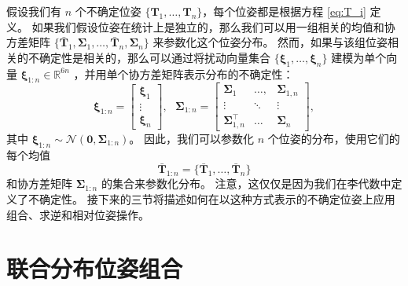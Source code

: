 


假设我们有 $n$ 个不确定位姿 $\{\mathbf{T}_1, \dots, \mathbf{T}_n\}$，每个位姿都是根据方程 \eqref{eq:T_i} 定义。 
如果我们假设位姿在统计上是独立的，那么我们可以用一组相关的均值和协方差矩阵 $\{\bar{\mathbf{T}}_1, \boldsymbol{\Sigma}_1, \dots, \bar{\mathbf{T}}_n, \boldsymbol{\Sigma}_n\}$ 来参数化这个位姿分布。 
然而，如果与该组位姿相关的不确定性是相关的，那么可以通过将扰动向量集合 $\{ \boldsymbol{\xi}_{1}, \dots, \boldsymbol{\xi}_n \} $ 建模为单个向量 $\boldsymbol{\xi}_{1:n} \in \mathbb{R}^{6n}$ ，并用单个协方差矩阵表示分布的不确定性： 
\begin{equation}
    \boldsymbol{\xi}_{1:n} = \left[ \begin{array}{c}
        \boldsymbol{\xi}_{1}  \\
        \vdots \\
        \boldsymbol{\xi}_n
    \end{array} \right], ~~~
    \boldsymbol{\Sigma}_{1:n} = \left[ \begin{array}{ccc}
        \boldsymbol{\Sigma}_1  & \dots, & \boldsymbol{\Sigma}_{1,n}  \\
        \vdots & \ddots & \vdots \\
        \boldsymbol{\Sigma}_{1,n}^\top & \dots & \boldsymbol{\Sigma}_{n}
    \end{array} \right], \label{eq:lie_joint_rep_cov}
\end{equation}
其中 $\boldsymbol{\xi}_{1:n} \sim \mathcal{N}(\mathbf{0}, \boldsymbol{\Sigma}_{1:n})$。 
因此，我们可以参数化 $n$ 个位姿的分布，使用它们的每个均值 
\begin{equation}
    \bar{\mathbf{T}}_{1:n} = \{ \bar{\mathbf{T}}_1, \dots, \bar{\mathbf{T}}_n\} \label{eq:lie_joint_rep_means}
\end{equation} 
和协方差矩阵 $\boldsymbol{\Sigma}_{1:n}$ 的集合来参数化分布。 
注意，这仅仅是因为我们在李代数中定义了不确定性。 %
接下来的三节将描述如何在以这种方式表示的不确定位姿上应用组合、求逆和相对位姿操作。

\section{联合分布位姿组合}
\label{sec:pose_composition}

